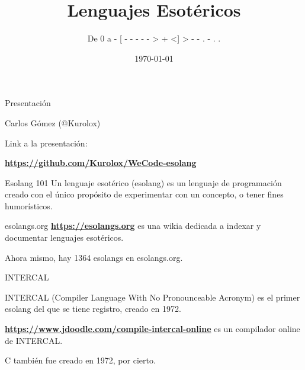 \documentclass{beamer}
\title{Lenguajes Esotéricos}
\subtitle{De 0 a - [ - - - - - > + <] > - - . - . .}
\institute{WeCodeFest 2019}
\date{\today}
\begin{document}
\begin{frame}
        \maketitle
\end{frame}
    \setlength{\parskip}{\baselineskip}%
    \setlength{\parindent}{0pt}%

\begin{frame}{Presentación}
\centering
{\Large Carlos Gómez (@Kurolox)\bigskip\pause

 Link a la presentación:}

\centering\textbf{\hyperlink{https://github.com/Kurolox/WeCode-esolang}{\Large https://github.com/Kurolox/WeCode-esolang}}
\end{frame}

\begin{frame}{Esolang 101}
    	\pause
        Un lenguaje esotérico (esolang) es un lenguaje de programación creado con el único propósito de experimentar con un concepto, o tener fines humorísticos.
\end{frame}
\begin{frame}{esolangs.org}
\textbf{\hyperlink{https://esolangs.org}{https://esolangs.org}} es una wikia dedicada a indexar y documentar lenguajes esotéricos.\pause

Ahora mismo, hay 1364 esolangs en esolangs.org.
\end{frame}

\begin{frame}{INTERCAL}

INTERCAL (Compiler Language With No Pronounceable Acronym) es el primer esolang del que se tiene registro, creado en 1972.

\textbf{\hyperlink{https://www.jdoodle.com/compile-intercal-online}{https://www.jdoodle.com/compile-intercal-online}} es un compilador online de INTERCAL.\pause

C también fue creado en 1972, por cierto.
\end{frame}
\end{document}
